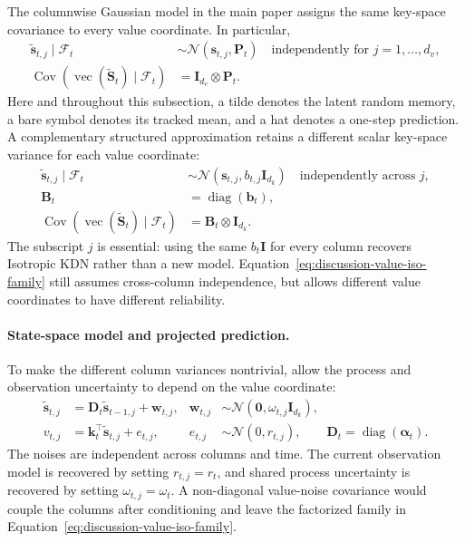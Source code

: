 \documentclass[11pt]{article}
\newcommand{\vct}[1]{\boldsymbol{#1}}
\newcommand{\diag}{\operatorname{diag}}
\begin{document}
The columnwise Gaussian model in the main paper assigns the same key-space covariance to every
value coordinate. In particular,
\begin{equation}
\begin{aligned}
  \widetilde{\vct{s}}_{t,j}\mid\mathcal{F}_t
  &\sim\mathcal{N}(\vct{s}_{t,j},\vct{P}_t)
    \quad\text{independently for }j=1,\ldots,d_v,
  \\
  \operatorname{Cov}\!\left(
    \operatorname{vec}(\widetilde{\vct{S}}_t)\mid\mathcal{F}_t
  \right)
  &=\vct{I}_{d_v}\otimes\vct{P}_t.
\end{aligned}
  \label{eq:discussion-value-iso-shared-family}
\end{equation}
Here and throughout this subsection, a tilde denotes the latent random memory, a bare symbol
denotes its tracked mean, and a hat denotes a one-step prediction. A complementary structured
approximation retains a different scalar key-space variance for each value coordinate:
\begin{equation}
\begin{aligned}
  \widetilde{\vct{s}}_{t,j}\mid\mathcal{F}_t
  &\sim\mathcal{N}(\vct{s}_{t,j},b_{t,j}\vct{I}_{d_k})
    \quad\text{independently across }j,
  \\
  \vct{B}_t&=\diag(\vct{b}_t),
  \\
  \operatorname{Cov}\!\left(
    \operatorname{vec}(\widetilde{\vct{S}}_t)\mid\mathcal{F}_t
  \right)
  &=\vct{B}_t\otimes\vct{I}_{d_k}.
\end{aligned}
  \label{eq:discussion-value-iso-family}
\end{equation}
The subscript $j$ is essential: using the same $b_t\vct{I}$ for every column recovers Isotropic
KDN rather than a new model. Equation~\eqref{eq:discussion-value-iso-family} still assumes
cross-column independence, but allows different value coordinates to have different reliability.

\paragraph{State-space model and projected prediction.}
To make the different column variances nontrivial, allow the process and observation uncertainty
to depend on the value coordinate:
\begin{equation}
\begin{aligned}
  \widetilde{\vct{s}}_{t,j}
  &=\vct{D}_t\widetilde{\vct{s}}_{t-1,j}+\vct{w}_{t,j},
  &
  \vct{w}_{t,j}
  &\sim\mathcal{N}(\vct{0},\omega_{t,j}\vct{I}_{d_k}),
  \\
  v_{t,j}
  &=\vct{k}_t^\top\widetilde{\vct{s}}_{t,j}+e_{t,j},
  &
  e_{t,j}
  &\sim\mathcal{N}(0,r_{t,j}),
  \qquad
  \vct{D}_t=\diag(\vct{\alpha}_t).
\end{aligned}
  \label{eq:discussion-value-iso-model}
\end{equation}
The noises are independent across columns and time. The current observation model is recovered by
setting $r_{t,j}=r_t$, and shared process uncertainty is recovered by setting
$\omega_{t,j}=\omega_t$. A non-diagonal value-noise covariance would couple the columns after
conditioning and leave the factorized family in Equation~\eqref{eq:discussion-value-iso-family}.
\end{document}
